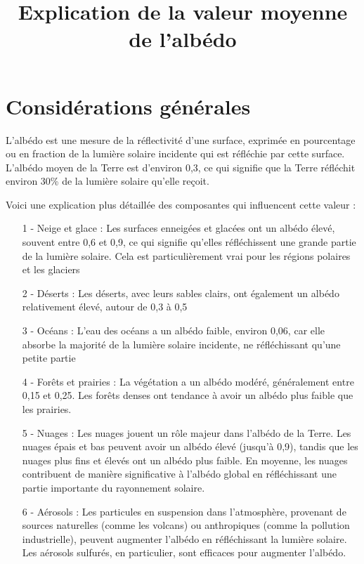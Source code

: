 \documentclass[a4paper,11pt]{article}
\title{Explication de la valeur moyenne de l'albédo}
\begin{document}
\section{Considérations générales}

L'albédo est une mesure de la réflectivité d'une surface, exprimée en pourcentage ou en fraction de la lumière solaire incidente qui est réfléchie par cette surface. L'albédo moyen de la Terre est d'environ 0,3, ce qui signifie que la Terre réfléchit environ 30\% de la lumière solaire qu'elle reçoit.

Voici une explication plus détaillée des composantes qui influencent cette valeur :

\begin{enumerate}

\item[1 -] Neige et glace : Les surfaces enneigées et glacées ont un albédo élevé, souvent entre 0,6 et 0,9, ce qui signifie qu'elles réfléchissent une grande partie de la lumière solaire. Cela est particulièrement vrai pour les régions polaires et les glaciers

\item[2 -] Déserts : Les déserts, avec leurs sables clairs, ont également un albédo relativement élevé, autour de 0,3 à 0,5

\item[3 -] Océans : L'eau des océans a un albédo faible, environ 0,06, car elle absorbe la majorité de la lumière solaire incidente, ne réfléchissant qu'une petite partie

\item[4 -] Forêts et prairies : La végétation a un albédo modéré, généralement entre 0,15 et 0,25. Les forêts denses ont tendance à avoir un albédo plus faible que les prairies.

\item[5 -] Nuages : Les nuages jouent un rôle majeur dans l'albédo de la Terre. Les nuages épais et bas peuvent avoir un albédo élevé (jusqu'à 0,9), tandis que les nuages plus fins et élevés ont un albédo plus faible. En moyenne, les nuages contribuent de manière significative à l'albédo global en réfléchissant une partie importante du rayonnement solaire.

\item[6 -] Aérosols : Les particules en suspension dans l'atmosphère, provenant de sources naturelles (comme les volcans) ou anthropiques (comme la pollution industrielle), peuvent augmenter l'albédo en réfléchissant la lumière solaire. Les aérosols sulfurés, en particulier, sont efficaces pour augmenter l'albédo.

\end{enumerate}	
\end{document}
